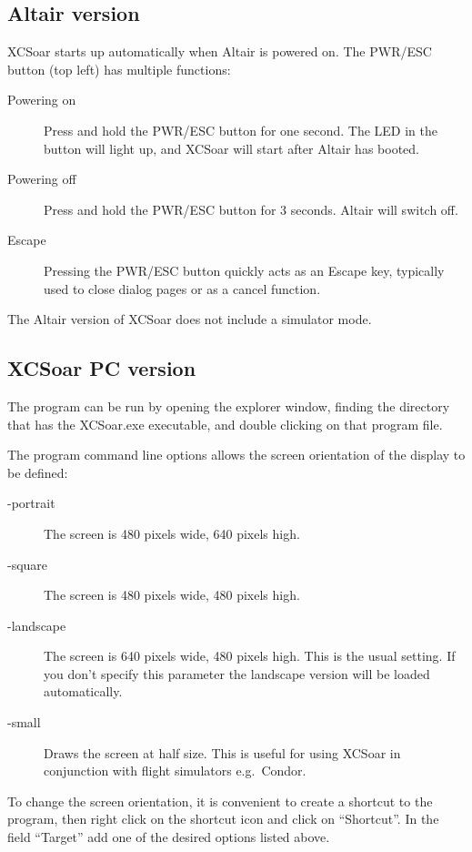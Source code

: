 \documentclass[a4paper,12pt]{refrep}
\begin{document}
\subsection*{Altair version}
XCSoar starts up automatically when Altair is powered on.
The PWR/ESC button (top left) has multiple functions:
\begin{description}
\item[Powering on]  Press and hold the PWR/ESC button for one second.
  The LED in the button will light up, and XCSoar will start after
  Altair has booted.
\item[Powering off]  Press and hold the PWR/ESC button for 3 seconds.
  Altair will switch off.
\item[Escape] Pressing the PWR/ESC button quickly acts as an
Escape key, typically used to close dialog pages or as a cancel function.
\end{description}

The Altair version of XCSoar does not include a simulator mode.

\subsection*{XCSoar PC version}
The program can be run by opening the explorer window, finding the directory
that has the XCSoar.exe executable, and double clicking on that program file.

The program command line options allows the screen orientation of
the display to be defined:
\begin{description}
\item[-portrait] The screen is 480 pixels wide, 640 pixels high.
\item[-square] The screen is 480 pixels wide, 480 pixels high.
\item[-landscape] The screen is 640 pixels wide, 480 pixels high. This is the
usual setting. If you don't specify this parameter the landscape version will be
loaded automatically.
\item[-small] Draws the screen at half size.  This is useful for using XCSoar in
 conjunction with flight simulators e.g.\ Condor.
\end{description}
To change the screen orientation, it is convenient to create a shortcut to the
program, then right click on the shortcut icon and click on ``Shortcut''. 
In the field ``Target'' add one of the desired options listed above.
\end{document}
